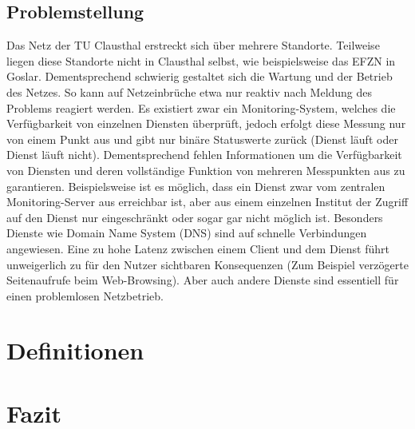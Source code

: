 \documentclass[titlepage]{report}
\begin{document}
\section*{Problemstellung}
Das Netz der TU Clausthal erstreckt sich über mehrere
Standorte. Teilweise liegen diese Standorte nicht in Clausthal
selbst, wie beispielsweise das EFZN in Goslar. Dementsprechend
schwierig gestaltet sich die Wartung und der Betrieb
des Netzes. So kann auf Netzeinbrüche etwa nur reaktiv
nach Meldung des Problems reagiert werden. Es existiert
zwar ein Monitoring-System, welches die Verfügbarkeit von
einzelnen Diensten überprüft, jedoch erfolgt diese Messung
nur von einem Punkt aus und gibt nur binäre Statuswerte
zurück (Dienst läuft oder Dienst läuft nicht). Dementsprechend
fehlen Informationen um die Verfügbarkeit von Diensten und
deren vollständige Funktion von mehreren Messpunkten aus
zu garantieren. Beispielsweise ist es möglich, dass ein Dienst
zwar vom zentralen Monitoring-Server aus erreichbar ist, aber
aus einem einzelnen Institut der Zugriff auf den Dienst nur
eingeschränkt oder sogar gar nicht möglich ist. Besonders
Dienste wie Domain Name System (DNS) sind auf schnelle
Verbindungen angewiesen. Eine zu hohe Latenz zwischen
einem Client und dem Dienst führt unweigerlich zu für den
Nutzer sichtbaren Konsequenzen (Zum Beispiel verzögerte
Seitenaufrufe beim Web-Browsing). Aber auch andere Dienste sind
essentiell für einen problemlosen Netzbetrieb.
\chapter*{Definitionen}
\chapter*{Fazit}
\nocite{*}
\printbibliography{}
\listoffigures
\end{document}
